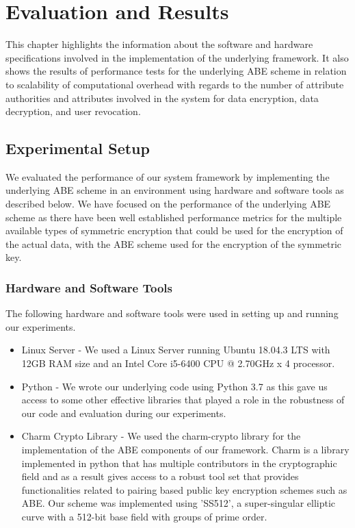\chapter{Evaluation and Results}
\label{chap:evaluation_and_results}

This chapter highlights the information about the software and hardware specifications involved in the implementation of the underlying framework. It also shows the results of performance tests for the underlying ABE scheme in relation to scalability of computational overhead with regards to the number of attribute authorities and attributes involved in the system for data encryption, data decryption, and user revocation.

\section{Experimental Setup}

We evaluated the performance of our system framework by implementing the underlying ABE scheme in an environment using hardware and software tools as described below. We have focused on the performance of the underlying ABE scheme as there have been well established performance metrics for the multiple available types of symmetric encryption that could be used for the encryption of the actual data, with the ABE scheme used for the encryption of the symmetric key. 

\subsection{Hardware and Software Tools}

The following hardware and software tools were used in setting up and running our experiments.

\begin{itemize}
	\item Linux Server - We used a Linux Server running Ubuntu 18.04.3 LTS with 12GB RAM size and an Intel Core i5-6400 CPU @ 2.70GHz x 4 processor.
	
	\item Python - We wrote our underlying code using Python 3.7 as this gave us access to some other effective libraries that played a role in the robustness of our code and evaluation during our experiments.
	
	\item Charm Crypto Library\cite{charm13crypto} - We used the charm-crypto library for the implementation of the ABE components of our framework. Charm is a library implemented in python that has multiple contributors in the cryptographic field and as a result gives access to a robust tool set that provides functionalities related to pairing based public key encryption schemes such as ABE. Our scheme was implemented using 'SS512', a super-singular elliptic curve with a 512-bit base field with groups of prime order.
\end{itemize}

